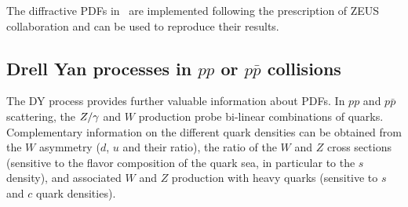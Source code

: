 The diffractive PDFs in \fitter\ are implemented following the prescription of ZEUS
collaboration \cite{zeus:diff2009} and can be used to reproduce their results.
%




\subsection{Drell Yan processes  in $pp$ or $p\bar p$ collisions}
\label{dysection}

The DY process
provides further valuable information about PDFs.
In $pp$ and $p\bar p$ scattering, the $Z/\gamma\*$ and $W$ production 
probe bi-linear combinations of quarks. 
Complementary information on the different quark densities
can be obtained from the $W$ asymmetry ($d$, $u$ and their ratio),
the ratio of the $W$ and $Z$ cross sections (sensitive to the flavor 
composition of the quark sea, in particular to the $s$ density), 
and associated $W$ and $Z$ production with
heavy quarks (sensitive to $s$ and $c$ quark densities).
%

